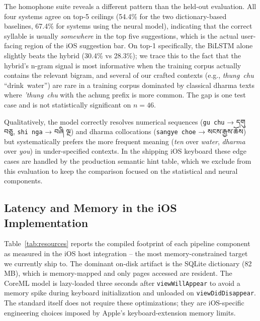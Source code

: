 \documentclass[11pt]{article}
\newcommand{\tib}[1]{{\fontspec{Jomolhari}#1}}
\begin{document}
The homophone suite reveals a different pattern than the held-out evaluation. All four systems agree on top-5 ceilings (54.4\% for the two dictionary-based baselines, 67.4\% for systems using the neural model), indicating that the correct syllable is usually \emph{somewhere} in the top five suggestions, which is the actual user-facing region of the iOS suggestion bar. On top-1 specifically, the BiLSTM alone slightly beats the hybrid (30.4\% vs 28.3\%); we trace this to the fact that the hybrid's n-gram signal is most informative when the training corpus actually contains the relevant bigram, and several of our crafted contexts (e.g., \textit{thung~chu} ``drink~water'') are rare in a training corpus dominated by classical dharma texts where \textit{'thung~chu} with the achung prefix is more common. The gap is one test case and is not statistically significant on $n=46$.

Qualitatively, the model correctly resolves numerical sequences (\texttt{gu chu} → \tib{དགུ བཅུ}, \texttt{shi nga} → \tib{བཞི ལྔ}) and dharma collocations (\texttt{sangye choe} → \tib{སངས་རྒྱས་ཆོས}) but systematically prefers the more frequent meaning (\textit{ten} over \textit{water}, \textit{dharma} over \textit{you}) in under-specified contexts. In the shipping iOS keyboard these edge cases are handled by the production semantic hint table, which we exclude from this evaluation to keep the comparison focused on the statistical and neural components.

\subsection{Latency and Memory in the iOS Implementation}

Table~\ref{tab:resources} reports the compiled footprint of each pipeline component as measured in the iOS host integration -- the most memory-constrained target we currently ship to. The dominant on-disk artifact is the SQLite dictionary (82\,MB), which is memory-mapped and only pages accessed are resident. The CoreML model is lazy-loaded three seconds after \texttt{viewWillAppear} to avoid a memory spike during keyboard initialization and unloaded on \texttt{viewDidDisappear}. The standard itself does not require these optimizations; they are iOS-specific engineering choices imposed by Apple's keyboard-extension memory limits.
\end{document}
